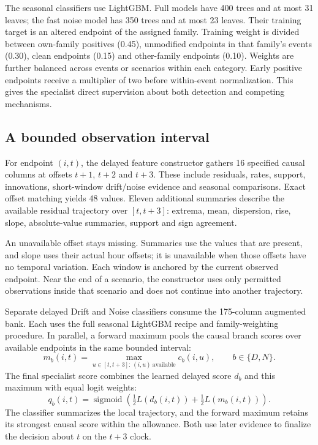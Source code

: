 The seasonal classifiers use LightGBM. Full models have 400 trees and at most 31 leaves; the fast noise model has 350 trees and at most 23 leaves. Their training target is an altered endpoint of the assigned family. Training weight is divided between own-family positives (0.45), unmodified endpoints in that family's events (0.30), clean endpoints (0.15) and other-family endpoints (0.10). Weights are further balanced across events or scenarios within each category. Early positive endpoints receive a multiplier of two before within-event normalization. This gives the specialist direct supervision about both detection and competing mechanisms.

\subsection{A bounded observation interval}
For endpoint $(i,t)$, the delayed feature constructor gathers 16 specified causal columns at offsets $t+1$, $t+2$ and $t+3$. These include residuals, rates, support, innovations, short-window drift/noise evidence and seasonal comparisons. Exact offset matching yields 48 values. Eleven additional summaries describe the available residual trajectory over $[t,t+3]$: extrema, mean, dispersion, rise, slope, absolute-value summaries, support and sign agreement.

An unavailable offset stays missing. Summaries use the values that are present, and slope uses their actual hour offsets; it is unavailable when those offsets have no temporal variation. Each window is anchored by the current observed endpoint. Near the end of a scenario, the constructor uses only permitted observations inside that scenario and does not continue into another trajectory.

Separate delayed Drift and Noise classifiers consume the 175-column augmented bank. Each uses the full seasonal LightGBM recipe and family-weighting procedure. In parallel, a forward maximum pools the causal branch scores over available endpoints in the same bounded interval:
\begin{equation}
 m_b(i,t)=\max_{u\in[t,t+3]:\,(i,u)\ \mathrm{available}}c_b(i,u),
 \qquad b\in\{D,N\}.
\end{equation}
The final specialist score combines the learned delayed score $d_b$ and this maximum with equal logit weights:
\begin{equation}
 q_b(i,t)=\operatorname{sigmoid}\left(\tfrac12L(d_b(i,t))+\tfrac12L(m_b(i,t))\right).
 \label{eq:specialistfinal}
\end{equation}
The classifier summarizes the local trajectory, and the forward maximum retains its strongest causal score within the allowance. Both use later evidence to finalize the decision about $t$ on the $t+3$ clock.

